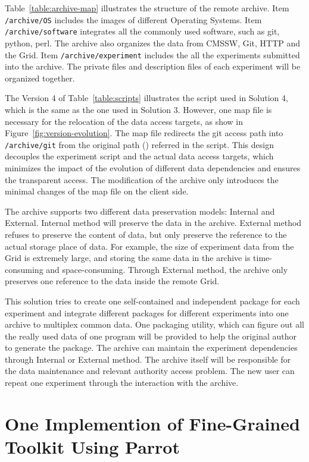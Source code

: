 \documentclass{sig-alternate}
\begin{document}
Table~\ref{table:archive-map} illustrates the structure of the remote archive.
Item {\tt /archive/OS} includes the images of different Operating Systems.
Item {\tt /archive/software} integrates all the commonly used software, such as git,
python, perl. The archive also organizes the data from CMSSW, Git, HTTP and the
Grid. Item {\tt /archive/experiment} includes the all the experiments submitted into the
archive. The private files and description files of each experiment will be
organized together.

The Version 4 of Table~\ref{table:scripts} illustrates the script used in
Solution 4, which is the same as the one used in Solution 3. 
However, one map file is necessary for the relocation of the data access targets, as
show in Figure~\ref{fig:version-evolution}. 
The map file redirects the git access path into {\tt /archive/git} from the original path () referred in the script.
This design decouples the experiment script and the actual data access targets, which minimizes the impact of the evolution of different data dependencies
and ensures the transparent access.
The modification of the archive only introduces the minimal changes of the map file on the client side.

The archive supports two different data preservation models: Internal and External. Internal method will preserve the data in the archive. External method refuses to preserve the content of data, but only preserve the reference to the actual storage place of data. For example, the size of experiment data from the Grid is extremely large, and storing the same data in the archive is time-consuming and space-consuming. Through External method, the archive only preserves one reference to the data inside the remote Grid.

This solution tries to create one self-contained and independent package for
each experiment and integrate different packages for different experiments into
one archive to multiplex common data. One packaging utility, which can figure out all the really used data of one program  will be provided
to help the original author to generate the package. The archive can maintain
the experiment dependencies through Internal or External method. The archive
itself will be responsible for the data maintenance and relevant authority
access problem. The new user can repeat one experiment through the
interaction with the archive.

\section{One Implemention of Fine-Grained Toolkit Using Parrot}
\end{document}
